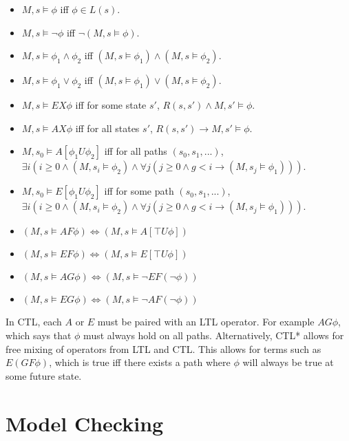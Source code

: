 \begin{itemize}
    \item $M, s \models \phi$ iff $\phi \in L(s)$.
    \item $M, s \models \lnot\phi$ iff $\lnot (M, s \models \phi)$.
    \item $M, s \models \phi_1 \land \phi_2$ iff $(M, s \models \phi_1) \land (M, s \models \phi_2)$.
    \item $M, s \models \phi_1 \lor \phi_2$ iff $(M, s \models \phi_1) \lor (M, s \models \phi_2)$.
    \item $M, s \models EX\phi$ iff for some state $s'$, $R(s, s') \land M, s' \models \phi$.
    \item $M, s \models AX\phi$ iff for all states $s'$, $R(s, s') \to M, s' \models \phi$.
    \item $M, s_0 \models A[\phi_1 U \phi_2]$ iff for all paths $(s_0, s_1, ...)$, $\exists i (i \geq 0 \land (M, s_i \models \phi_2) \land \forall j (j \geq 0 \land g < i \to (M, s_j \models \phi_1)))$.
    \item $M, s_0 \models E[\phi_1 U \phi_2]$ iff for some path $(s_0, s_1, ...)$, $\exists i (i \geq 0 \land (M, s_i \models \phi_2) \land \forall j (j \geq 0 \land g < i \to (M, s_j \models \phi_1)))$.
    \item $(M, s \models AF\phi) \Leftrightarrow (M, s \models A[\top U \phi])$
    \item $(M, s \models EF\phi) \Leftrightarrow (M, s \models E[\top U \phi])$
    \item $(M, s \models AG\phi) \Leftrightarrow (M, s \models \lnot EF (\lnot \phi))$
    \item $(M, s \models EG\phi) \Leftrightarrow (M, s \models \lnot AF (\lnot \phi))$
\end{itemize}

In CTL, each $A$ or $E$ must be paired with an LTL operator. For example
$AG\phi$, which says that $\phi$ must always hold on all paths. Alternatively,
CTL* allows for free mixing of operators from LTL and CTL. This allows for
terms such as $E(GF\phi)$, which is true iff there exists a path where $\phi$
will always be true at some future state.

\section{Model Checking}

